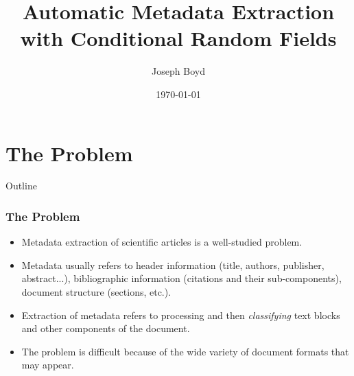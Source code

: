\documentclass{beamer}
\title[Automatic Metadata Extraction]{Automatic Metadata Extraction with Conditional Random Fields} %
\author{Joseph Boyd} %
\institute[EPFL] %
{
\'Ecole Polytechnique F\'ed\'erale de Lausanne \\ %
\medskip
\textit{joseph.boyd@epfl.ch} %
}
\date{\today} %
\begin{document}
\begin{frame}
\titlepage %
\end{frame}


\section{The Problem}
\begin{frame}[noframenumbering]{Outline}
\end{frame}


\begin{frame}
\frametitle{The Problem}
\begin{itemize}
\item Metadata extraction of scientific articles is a well-studied problem.
\item Metadata usually refers to header information (title, authors, publisher, abstract...), bibliographic information (citations and their sub-components), document structure (sections, etc.).
\item Extraction of metadata refers to processing and then \emph{classifying} text blocks and other components of the document.
\item The problem is difficult because of the wide variety of document formats that may appear.
\end{itemize}
\end{frame}

\end{document}
